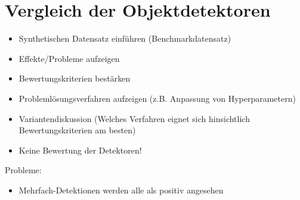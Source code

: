 \section{Vergleich der Objektdetektoren}

\begin{itemize}
	\item Synthetischen Datensatz einführen (Benchmarkdatensatz)
	\item Effekte/Probleme aufzeigen
	\item Bewertungskriterien bestärken
	\item Problemlösungsverfahren aufzeigen (z.B. Anpassung von Hyperparametern)
	\item Variantendiskussion (Welches Verfahren eignet sich hinsichtlich Bewertungskriterien am besten)
	\item Keine Bewertung der Detektoren!
\end{itemize}

Probleme:
\begin{itemize}
	\item Mehrfach-Detektionen werden alle als positiv angesehen
\end{itemize} 

\newpage